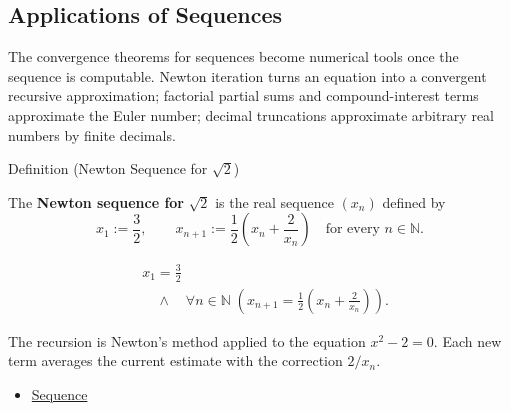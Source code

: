\subsection*{Applications of Sequences}
\begin{exposition}
The convergence theorems for sequences become numerical tools once the
sequence is computable. Newton iteration turns an equation into a convergent
recursive approximation; factorial partial sums and compound-interest terms
approximate the Euler number; decimal truncations approximate arbitrary real
numbers by finite decimals.
\end{exposition}


\begin{definitionbox}{Definition (Newton Sequence for $\sqrt{2}$)}
\begin{definition}
\label{def:newton-sequence-sqrt-two}
The \textbf{Newton sequence for} $\sqrt{2}$ is the real sequence $(x_n)$
defined by
\[
  x_1:=\frac{3}{2},
  \qquad
  x_{n+1}:=\frac{1}{2}\left(x_n+\frac{2}{x_n}\right)
  \quad\text{for every } n\in\mathbb{N}.
\]
\end{definition}
\end{definitionbox}

\begin{remark*}
\[
\begin{aligned}
&x_1=\frac{3}{2}\\
&\quad\land\quad
\forall n\in\mathbb{N}\;
\left(
  x_{n+1}=\frac{1}{2}\left(x_n+\frac{2}{x_n}\right)
\right).
\end{aligned}
\]
\end{remark*}

\begin{remark*}[Interpretation]
The recursion is Newton's method applied to the equation $x^2-2=0$.
Each new term averages the current estimate with the correction $2/x_n$.
\end{remark*}

\begin{remark*}[Dependencies]\hfill
\begin{itemize}
  \item \hyperref[def:sequence]{Sequence}
\end{itemize}
\end{remark*}

